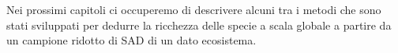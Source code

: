 Nei prossimi capitoli ci occuperemo di descrivere alcuni tra i metodi che sono stati sviluppati per dedurre la ricchezza delle specie a scala globale a partire da un campione ridotto di SAD di un dato ecosistema. 








%



           

